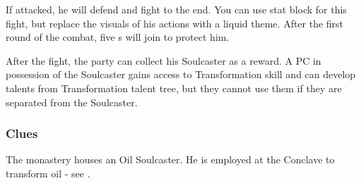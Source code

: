 If attacked, he will defend and fight to the end. You can use \enemySoulcaster{} stat block for this fight, but replace the visuals of his actions with a liquid theme. After the first round of the combat, five \enemyDiagramMuscle{}s will join to protect him.

After the fight, the party can collect his Soulcaster as a reward. A PC in possession of the Soulcaster gains access to Transformation skill and can develop talents from Transformation talent tree, but they cannot use them if they are separated from the Soulcaster.

\subsubsection{Clues}

The monastery houses an Oil Soulcaster. He is employed at the Conclave to transform oil - see .


